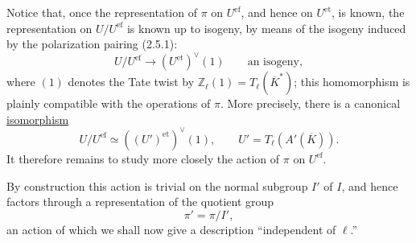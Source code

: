 Notice that, once the representation of $\pi$ on $U^{\mathrm{ef}}$, and
hence on $U^{\mathrm{et}}$, is known, the representation on
$U/U^{\mathrm{ef}}$ is known up to isogeny, by means of the isogeny
induced by the polarization pairing (2.5.1):
\begin{equation}\tag{4.1.2}
 U/U^{\mathrm{ef}}\longrightarrow (U^{\mathrm{et}})^\vee(1)
 \qquad\text{an isogeny},
\end{equation}
where $(1)$ denotes the Tate twist by
$\mathbb Z_\ell(1)=T_\ell(\overline K^*)$; this homomorphism is plainly
compatible with the operations of $\pi$.  More precisely, there is a
canonical \underline{isomorphism}
\[
 U/U^{\mathrm{ef}}\simeq ((U')^{\mathrm{et}})^\vee(1),
 \qquad U'=T_\ell(A'(\overline K)).
\]
It therefore remains to study more closely the action of $\pi$ on
$U^{\mathrm{ef}}$.

By construction this action is trivial on the normal subgroup $I'$ of
$I$, and hence factors through a representation of the quotient group
\begin{equation}\tag{4.1.3}
 \pi'=\pi/I',
\end{equation}
an action of which we shall now give a description ``independent of
$\ell$.''

